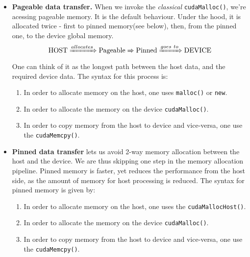 \begin{itemize}
   \setlength\itemsep{-0.5em}

   \item \textbf{Pageable data transfer.} When we invoke the \textit{classical} \verb|cudaMalloc()|, 
   we're acessing pageable memory. It is the default behaviour. 
    Under the hood, it is allocated twice - first to pinned memory(see below), 
   then, from the pinned one, to the device global memory. 
      \begin{equation}
        \text{HOST}\xRightarrow{allocates}\text{Pageable} 
        \xRightarrow{} \text{Pinned} \xRightarrow{goes\ to}\text{DEVICE}
      \end{equation}
    One can think of it as the longest path between the host data, 
   and the required device data.
    The syntax for this process is:
    \begin{enumerate}
      \item In order to allocate memory on the host, one uses \verb|malloc()| or \verb|new|.
      \item In order to allocate the memory on the device \verb|cudaMalloc()|.
      \item In order to copy memory from the host to device and vice-versa, one use the \verb|cudaMemcpy()|.
    \end{enumerate}

   \item \textbf{Pinned data transfer} lets us avoid 2-way memory allocation between the host and the device. 
  We are thus skipping one step in the memory allocation pipeline.
   Pinned memory is faster, yet reduces the 
    performance from the host side, as the amount of memory 
    for host processing is reduced.
  The syntax for pinned memory is given by:
    \begin{enumerate}
      \item In order to allocate memory on the host, one uses the \verb|cudaMallocHost()|.
      \item In order to allocate the memory on the device \verb|cudaMalloc()|.
      \item In order to copy memory from the host to device and vice-versa, one use the \verb|cudaMemcpy()|.
    \end{enumerate}


\end{itemize}
